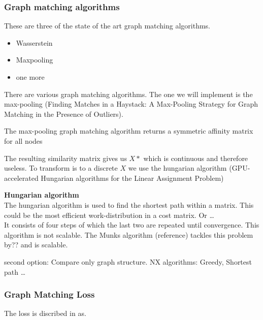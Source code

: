 \subsubsection{Graph matching algorithms}
These are three of the state of the art graph matching algorithms.

\begin{itemize}
    \item Wasserstein
    \item Maxpooling
    \item one more
\end{itemize}

There are various graph matching algorithms. The one we will implement is the max-pooling (Finding Matches in a Haystack: A Max-Pooling Strategy for Graph Matching in the Presence of Outliers). 

The max-pooling graph matching algorithm returns a symmetric affinity matrix for all nodes

The resulting similarity matrix gives us $X*$ which is continuous and therefore useless. To transform is to a discrete $X$ we use the hungarian algorithm (GPU-accelerated Hungarian algorithms for the Linear
Assignment Problem)

\textbf{Hungarian algorithm}\\
The hungarian algorithm is used to find the shortest path within a matrix. This could be the most efficient work-distribution in a cost matrix. Or \dots \\
It consists of four steps of which the last two are repeated until convergence. This algorithm is not scalable. The Munks algorithm (reference) tackles this problem by?? and is scalable.

second option: \leavevmode
Compare only graph structure. 
NX algorithms: Greedy, Shortest path \dots
\\
\subsubsection{Graph Matching Loss}
The loss is discribed in \cite{simonovsky_graphvae_2018} as.

